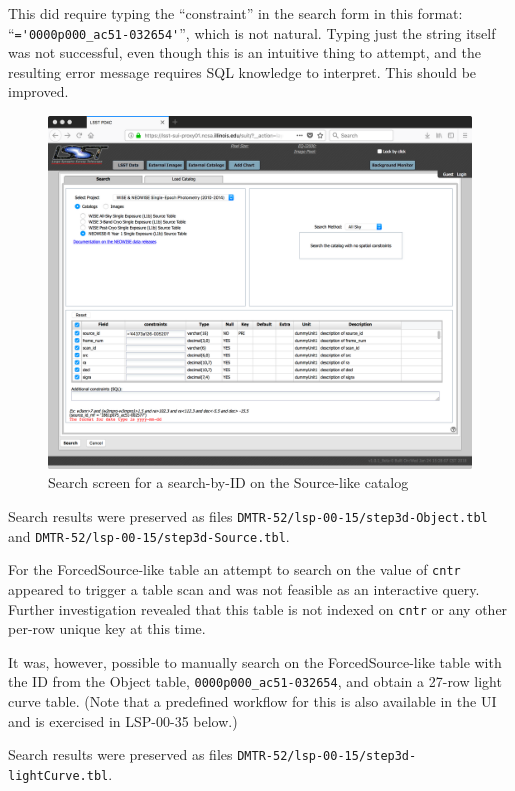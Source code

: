 This did require typing the ``constraint'' in the search form in this format: ``\verb|='0000p000_ac51-032654'|'',
which is not natural.
Typing just the string itself was not successful, even though this is an intuitive thing to attempt,
and the resulting error message requires SQL knowledge to interpret.
This should be improved.

\begin{figure}
  \includegraphics[width=\linewidth]{lsp-00-15/step3d-Source-search.png}
  \caption{Search screen for a search-by-ID on the Source-like catalog}
  \label{fig:lsp-00-15-source-id-search}
\end{figure}

Search results were preserved as files \verb|DMTR-52/lsp-00-15/step3d-Object.tbl| and \verb|DMTR-52/lsp-00-15/step3d-Source.tbl|.

For the ForcedSource-like table an attempt to search on the value of \verb|cntr| appeared to trigger a table scan and was not feasible as an interactive query.
Further investigation revealed that this table is not indexed on \verb|cntr| or any other per-row unique key at this time.

It was, however, possible to manually search on the ForcedSource-like table with the ID from the Object table, \verb|0000p000_ac51-032654|,
and obtain a 27-row light curve table.
(Note that a predefined workflow for this is also available in the UI and is exercised in LSP-00-35 below.)

Search results were preserved as files \verb|DMTR-52/lsp-00-15/step3d-lightCurve.tbl|.

